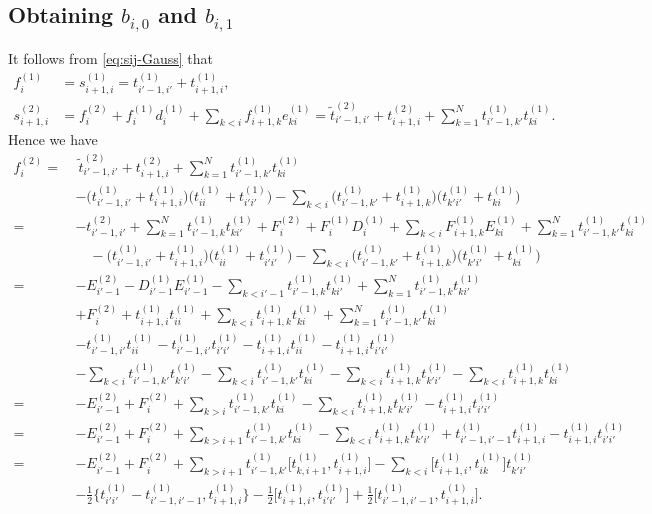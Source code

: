 \documentclass[11pt,reqno]{amsart}
\numberwithin{equation}{section}
\theoremstyle{definition}
\theoremstyle{remark}
\newcommand{\tl}{\tilde}
\begin{document}
\subsection{Obtaining $b_{i,0}$ and $b_{i,1}$}\label{ssec:obtain-b}
It follows from \eqref{eq:sij-Gauss} that
\begin{align*}
  f_i^{(1)}
    &=s_{i+1,i}^{(1)}
      =t_{i'-1,i'}^{(1)}+t_{i+1,i}^{(1)},\\
  s_{i+1,i}^{(2)}
    &=f_i^{(2)}+f_i^{(1)}d_i^{(1)}+
      \sum_{k<i}f_{i+1,k}^{(1)}e_{ki}^{(1)}=\tl t_{i'-1,i'}^{(2)}+t_{i+1,i}^{(2)}
      +\sum_{k=1}^{N}t_{i'-1,k'}^{(1)}t_{ki}^{(1)}.
\end{align*}
Hence we have
\begin{align*}
f_i^{(2)}
=\,&~
\tl{t}_{i'-1,i'}^{(2)}
+t_{i+1,i}^{(2)}
+\sum_{k=1}^{N} t_{i'-1,k'}^{(1)}t_{ki}^{(1)}
\\
&-\big(t_{i'-1,i'}^{(1)}+t_{i+1,i}^{(1)}\big)
 \big(t_{ii}^{(1)}+t_{i'i'}^{(1)}\big)
-\sum_{k<i}
\big(t_{i'-1,k'}^{(1)}+t_{i+1,k}^{(1)}\big)
\big(t_{k'i'}^{(1)}+t_{ki}^{(1)}\big)
\\
=\,&
-t_{i'-1,i'}^{(2)}
+\sum_{k=1}^{N}t_{i'-1,k}^{(1)}t_{ki'}^{(1)}
+F_i^{(2)}
+F_i^{(1)}D_i^{(1)}
+\sum_{k<i}F_{i+1,k}^{(1)}E_{ki}^{(1)}
+\sum_{k=1}^{N}t_{i'-1,k'}^{(1)}t_{ki}^{(1)}
\\
&\quad
-\big(t_{i'-1,i'}^{(1)}+t_{i+1,i}^{(1)}\big)
 \big(t_{ii}^{(1)}+t_{i'i'}^{(1)}\big)
-\sum_{k<i}
\big(t_{i'-1,k'}^{(1)}+t_{i+1,k}^{(1)}\big)
\big(t_{k'i'}^{(1)}+t_{ki}^{(1)}\big)
\\
=\,&
-E_{i'-1}^{(2)}
-D_{i'-1}^{(1)}E_{i'-1}^{(1)}
-\sum_{k<i'-1}t_{i'-1,k}^{(1)}t_{ki'}^{(1)}
+\sum_{k=1}^{N}t_{i'-1,k}^{(1)}t_{ki'}^{(1)}
\\
&
+F_i^{(2)}
+t_{i+1,i}^{(1)}t_{ii}^{(1)}
+\sum_{k<i}t_{i+1,k}^{(1)}t_{ki}^{(1)}
+\sum_{k=1}^{N}t_{i'-1,k'}^{(1)}t_{ki}^{(1)}
\\
&
-t_{i'-1,i'}^{(1)}t_{ii}^{(1)}
-t_{i'-1,i'}^{(1)}t_{i'i'}^{(1)}
-t_{i+1,i}^{(1)}t_{ii}^{(1)}
-t_{i+1,i}^{(1)}t_{i'i'}^{(1)}
\\
&
-\sum_{k<i}t_{i'-1,k'}^{(1)}t_{k'i'}^{(1)}
-\sum_{k<i}t_{i'-1,k'}^{(1)}t_{ki}^{(1)}
-\sum_{k<i}t_{i+1,k}^{(1)}t_{k'i'}^{(1)}
-\sum_{k<i}t_{i+1,k}^{(1)}t_{ki}^{(1)}
\\[2mm]
={}&
-E_{i'-1}^{(2)}
+F_i^{(2)}
+\sum_{k>i}t_{i'-1,k'}^{(1)}t_{ki}^{(1)}
-\sum_{k<i}t_{i+1,k}^{(1)}t_{k'i'}^{(1)}
-t_{i+1,i}^{(1)}t_{i'i'}^{(1)}
\\[2mm]
={}&
-E_{i'-1}^{(2)}
+F_i^{(2)}
+\sum_{k>i+1}t_{i'-1,k'}^{(1)}t_{ki}^{(1)}
-\sum_{k<i}t_{i+1,k}^{(1)}t_{k'i'}^{(1)}
+t_{i'-1,i'-1}^{(1)}t_{i+1,i}^{(1)}
-t_{i+1,i}^{(1)}t_{i'i'}^{(1)}
\\
=\,&
-E_{i'-1}^{(2)}
+F_i^{(2)}
+\sum_{k>i+1}
t_{i'-1,k'}^{(1)}
\big[t_{k,i+1}^{(1)},t_{i+1,i}^{(1)}\big]
-\sum_{k<i}
\big[t_{i+1,i}^{(1)},t_{ik}^{(1)}\big]
t_{k'i'}^{(1)}
\\
& 
-\tfrac{1}{2}
\big\{
t_{i'i'}^{(1)}-t_{i'-1,i'-1}^{(1)},
t_{i+1,i}^{(1)}
\big\}
-\tfrac{1}{2}
\big[t_{i+1,i}^{(1)},t_{i'i'}^{(1)}\big]
+\tfrac{1}{2}
\big[t_{i'-1,i'-1}^{(1)},t_{i+1,i}^{(1)}\big].
\end{align*}
\end{document}
